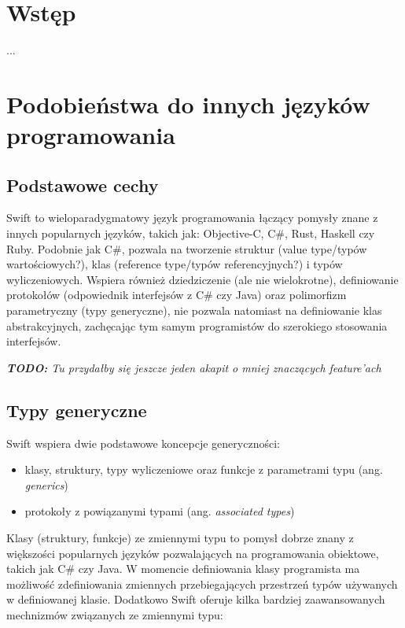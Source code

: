 \documentclass[mgr, shortabstract]{iithesis}
\author         {Maksymilian Debeściak}
\newcommand{\todo}[1]{
  \textit{\textbf{TODO: }#1}
}
\begin{document}

\chapter{Wstęp}
\label{ch:wstep}

...

\chapter{Podobieństwa do innych języków programowania}
\label{ch:podobienstwa_do_innych}

\section{Podstawowe cechy}
\label{s:podstawowe_cechy}

Swift to wieloparadygmatowy język programowania łączący pomysły znane z innych popularnych języków, takich jak: Objective-C, C\#, Rust, Haskell czy Ruby. Podobnie jak C\#, pozwala na tworzenie struktur (value type/typów wartościowych?), klas (reference type/typów referencyjnych?) i typów wyliczeniowych. Wspiera również dziedziczenie (ale nie wielokrotne), definiowanie protokołów (odpowiednik interfejsów z C\# czy Java) oraz polimorfizm parametryczny (typy generyczne), nie pozwala natomiast na definiowanie klas abstrakcyjnych, zachęcając tym samym programistów do szerokiego stosowania interfejsów.

\todo{Tu przydałby się jeszcze jeden akapit o mniej znaczących feature'ach}

\section{Typy generyczne}
\label{s:typy_generyczne}

Swift wspiera dwie podstawowe koncepcje generyczności:
\begin{itemize}
  \item klasy, struktury, typy wyliczeniowe oraz funkcje z parametrami typu (ang. \textit{generics})
  \item protokoły z powiązanymi typami (ang. \textit{associated types})
\end{itemize}

Klasy (struktury, funkcje) ze zmiennymi typu to pomysł dobrze znany z większości popularnych języków pozwalających na programowania obiektowe, takich jak C\# czy Java. W momencie definiowania klasy programista ma możliwość zdefiniowania zmiennych przebiegających przestrzeń typów używanych w definiowanej klasie. Dodatkowo Swift oferuje kilka bardziej zaawansowanych mechnizmów związanych ze zmiennymi typu:
\end{document}
